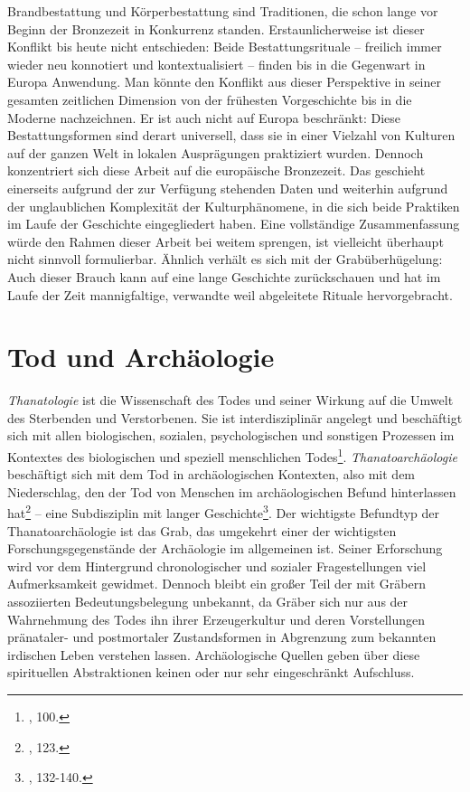 \documentclass[openany,twoside,twocolumn]{book}
\let\rmarkdownfootnote\footnote%
\def\footnote{\protect\rmarkdownfootnote}
\begin{document}
Brandbestattung und Körperbestattung sind Traditionen, die schon lange vor Beginn der Bronzezeit in Konkurrenz standen. Erstaunlicherweise ist dieser Konflikt bis heute nicht entschieden: Beide Bestattungsrituale -- freilich immer wieder neu konnotiert und kontextualisiert -- finden bis in die Gegenwart in Europa Anwendung. Man könnte den Konflikt aus dieser Perspektive in seiner gesamten zeitlichen Dimension von der frühesten Vorgeschichte bis in die Moderne nachzeichnen. Er ist auch nicht auf Europa beschränkt: Diese Bestattungsformen sind derart universell, dass sie in einer Vielzahl von Kulturen auf der ganzen Welt in lokalen Ausprägungen praktiziert wurden. Dennoch konzentriert sich diese Arbeit auf die europäische Bronzezeit. Das geschieht einerseits aufgrund der zur Verfügung stehenden Daten und weiterhin aufgrund der unglaublichen Komplexität der Kulturphänomene, in die sich beide Praktiken im Laufe der Geschichte eingegliedert haben. Eine vollständige Zusammenfassung würde den Rahmen dieser Arbeit bei weitem sprengen, ist vielleicht überhaupt nicht sinnvoll formulierbar. Ähnlich verhält es sich mit der Grabüberhügelung: Auch dieser Brauch kann auf eine lange Geschichte zurückschauen und hat im Laufe der Zeit mannigfaltige, verwandte weil abgeleitete Rituale hervorgebracht.

\hypertarget{death-and-archaeology}{%
\section{Tod und Archäologie}\label{death-and-archaeology}}

\emph{Thanatologie} ist die Wissenschaft des Todes und seiner Wirkung auf die Umwelt des Sterbenden und Verstorbenen. Sie ist interdisziplinär angelegt und beschäftigt sich mit allen biologischen, sozialen, psychologischen und sonstigen Prozessen im Kontextes des biologischen und speziell menschlichen Todes\footnote{\textcite{hofmann_rituelle_2008}, 100.}. \emph{Thanatoarchäologie} beschäftigt sich mit dem Tod in archäologischen Kontexten, also mit dem Niederschlag, den der Tod von Menschen im archäologischen Befund hinterlassen hat\footnote{\textcite{hofmann_rituelle_2008}, 123.} -- eine Subdisziplin mit langer Geschichte\footnote{\textcite{hofmann_rituelle_2008}, 132-140.}. Der wichtigste Befundtyp der Thanatoarchäologie ist das Grab, das umgekehrt einer der wichtigsten Forschungsgegenstände der Archäologie im allgemeinen ist. Seiner Erforschung wird vor dem Hintergrund chronologischer und sozialer Fragestellungen viel Aufmerksamkeit gewidmet. Dennoch bleibt ein großer Teil der mit Gräbern assoziierten Bedeutungsbelegung unbekannt, da Gräber sich nur aus der Wahrnehmung des Todes ihn ihrer Erzeugerkultur und deren Vorstellungen pränataler- und postmortaler Zustandsformen in Abgrenzung zum bekannten irdischen Leben verstehen lassen. Archäologische Quellen geben über diese spirituellen Abstraktionen keinen oder nur sehr eingeschränkt Aufschluss.
\end{document}
